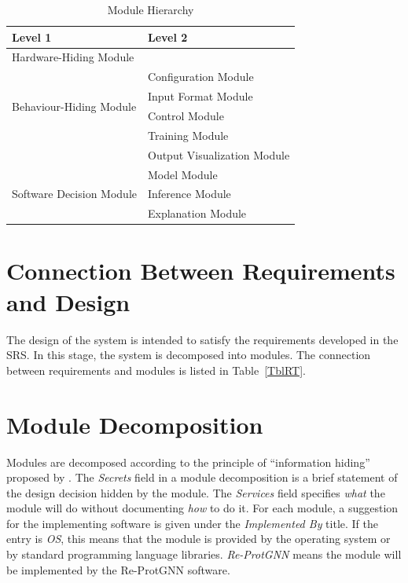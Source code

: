 \documentclass[12pt, titlepage]{article}
\begin{document}
\begin{table}[h!]
\centering
\begin{tabular}{p{} p{}}
\toprule
\textbf{Level 1} & \textbf{Level 2}\\
\midrule

{Hardware-Hiding Module} & ~ \\
\midrule

\multirow{4}{0.3\textwidth}{Behaviour-Hiding Module} 
& Configuration Module\\
& Input Format Module\\
& Control Module\\
& Training Module\\
& Output Visualization Module\\
\midrule

\multirow{3}{0.3\textwidth}{Software Decision Module} & {Model Module}\\
& Inference Module\\
& Explanation Module\\
\bottomrule

\end{tabular}
\caption{Module Hierarchy}
\label{TblMH}
\end{table}

\section{Connection Between Requirements and Design} \label{SecConnection}

The design of the system is intended to satisfy the requirements developed in
the SRS. In this stage, the system is decomposed into modules. The connection
between requirements and modules is listed in Table~\ref{TblRT}.

\section{Module Decomposition} \label{SecMD}

Modules are decomposed according to the principle of ``information hiding''
proposed by \citet{ParnasEtAl1984}. The \emph{Secrets} field in a module
decomposition is a brief statement of the design decision hidden by the
module. The \emph{Services} field specifies \emph{what} the module will do
without documenting \emph{how} to do it. For each module, a suggestion for the
implementing software is given under the \emph{Implemented By} title. If the
entry is \emph{OS}, this means that the module is provided by the operating
system or by standard programming language libraries.  \emph{Re-ProtGNN} means the
module will be implemented by the Re-ProtGNN software.
\end{document}
